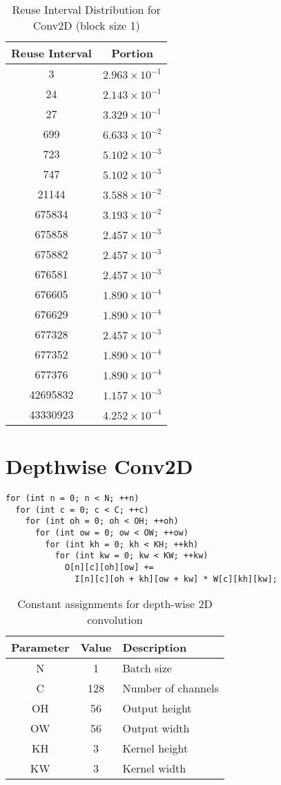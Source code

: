 \documentclass[conference]{article}
\begin{document}
\begin{table}[H]
\centering
\begin{tabular}{|c|c|}
    \hline
    Reuse Interval & Portion \\ 
    \hline
    3 & $2.963 \times 10^{-1}$ \\ 
    24 & $2.143 \times 10^{-1}$ \\ 
    27 & $3.329 \times 10^{-1}$ \\ 
    699 & $6.633 \times 10^{-2}$ \\ 
    723 & $5.102 \times 10^{-3}$ \\ 
    747 & $5.102 \times 10^{-3}$ \\ 
    21144 & $3.588 \times 10^{-2}$ \\ 
    675834 & $3.193 \times 10^{-2}$ \\ 
    675858 & $2.457 \times 10^{-3}$ \\ 
    675882 & $2.457 \times 10^{-3}$ \\ 
    676581 & $2.457 \times 10^{-3}$ \\ 
    676605 & $1.890 \times 10^{-4}$ \\ 
    676629 & $1.890 \times 10^{-4}$ \\ 
    677328 & $2.457 \times 10^{-3}$ \\ 
    677352 & $1.890 \times 10^{-4}$ \\ 
    677376 & $1.890 \times 10^{-4}$ \\ 
    42695832 & $1.157 \times 10^{-3}$ \\ 
    43330923 & $4.252 \times 10^{-4}$ \\ 
    \hline
\end{tabular}
\caption{Reuse Interval Distribution for Conv2D (block size 1)}
\end{table}


\section{Depthwise Conv2D}
\begin{verbatim}
for (int n = 0; n < N; ++n)
  for (int c = 0; c < C; ++c)
    for (int oh = 0; oh < OH; ++oh)
      for (int ow = 0; ow < OW; ++ow)
        for (int kh = 0; kh < KH; ++kh)
          for (int kw = 0; kw < KW; ++kw)
            O[n][c][oh][ow] +=
              I[n][c][oh + kh][ow + kw] * W[c][kh][kw];
\end{verbatim}

\begin{table}[H]
\centering
\begin{tabular}{|c|c|l|}
\hline
Parameter & Value & Description \\
\hline
N & 1 & Batch size \\
C & 128 & Number of channels \\
OH & 56 & Output height \\
OW & 56 & Output width \\
KH & 3 & Kernel height \\
KW & 3 & Kernel width \\
\hline
\end{tabular}
\caption{Constant assignments for depth-wise 2D convolution}
\end{table}
\end{document}
